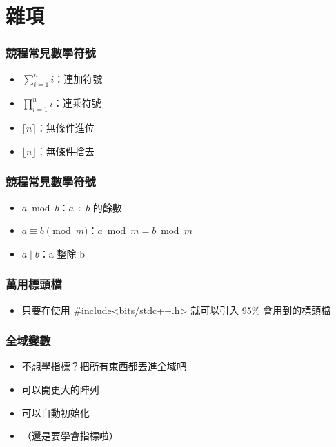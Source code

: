 \documentclass{beamer}
\begin{document}
\section{雜項}

\begin{frame}
    \frametitle{競程常見數學符號}
    \begin{itemize}
        \item $\displaystyle\sum_{i=1}^{n} i$：連加符號
        \item $\displaystyle\prod_{i=1}^{n} i$：連乘符號
        \vspace{0.5cm}
        \item<2-> $\lceil n \rceil$：無條件進位
        \item<2-> $\lfloor n \rfloor$：無條件捨去
    \end{itemize}
\end{frame}

\begin{frame}
    \frametitle{競程常見數學符號}
    \begin{itemize}
        \item $a \bmod b$：$a \div b$ 的餘數
        \item $a \equiv b \pmod{m}$：$a \bmod m = b \bmod m$
        \item $a \mid b$：a 整除 b
    \end{itemize}
\end{frame}

\begin{frame}
    \frametitle{萬用標頭檔}
    \begin{itemize}
        \item 只要在使用 \#include<bits/stdc++.h> 就可以引入 95\% 會用到的標頭檔
    \end{itemize}
\end{frame}

\begin{frame}
    \frametitle{全域變數}
    \begin{itemize}
        \item 不想學指標？把所有東西都丟進全域吧
        \item 可以開更大的陣列
        \item 可以自動初始化
        \item （還是要學會指標啦）
    \end{itemize}
\end{frame}
\end{document}
